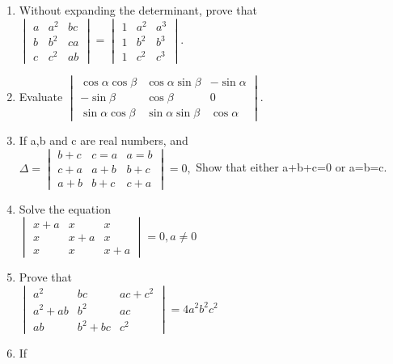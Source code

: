 \documentclass[journal,12pt,twocolumn]{IEEEtran}
\renewcommand\thesection{\arabic{section}}
\begin{document}
\begin{enumerate}[label=\thesection.\arabic*.,ref=\thesection.\theenumi]
\item Without expanding the determinant, prove that\\ $\begin{vmatrix}
a&a^2&bc \\ b&b^2&ca \\c&c^2&ab
\end{vmatrix}=\begin{vmatrix}
1&a^2&a^3 \\ 1&b^2&b^3 \\ 1&c^2&c^3
\end{vmatrix}$.
\\
\solution
%
\item Evaluate 
$\begin{vmatrix}
\cos\alpha \cos\beta &\cos\alpha \sin\beta &-\sin\alpha \\ -\sin\beta & \cos\beta &0 \\ \sin\alpha\cos\beta&\sin\alpha\sin\beta&\cos\alpha
\end{vmatrix}.$\\
\solution 

\item If a,b and c are real numbers, and \\$\Delta=\begin{vmatrix}
b+c&c=a&a=b \\ c+a&a+b&b+c \\ a+b&b+c&c+a
\end{vmatrix}=0,$ Show that either a+b+c=0 or a=b=c.\\
\solution 

\item Solve the equation\\ $\begin{vmatrix}
x+a&x&x \\ x&x+a&x \\ x&x&x+a
\end{vmatrix}=0, a\neq0$\\
\solution 

\item Prove that \\
$\begin{vmatrix}
a^2&bc&ac+c^2 \\ a^2+ab&b^2&ac \\ab&b^2+bc&c^2
\end{vmatrix}= 4a^2b^2c^2$\\
\solution 

\item If \\

\end{enumerate}
\end{document}
